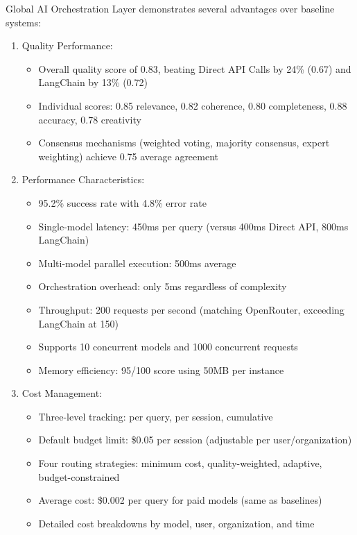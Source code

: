 \documentclass[final,5p,times,twocolumn,authoryear,draft]{elsarticle}
\begin{document}
Global AI Orchestration Layer demonstrates several advantages over baseline systems:

\begin{enumerate}
    \item  Quality Performance:
\begin{itemize}
    \item Overall quality score of 0.83, beating Direct API Calls by 24\% (0.67) and LangChain by 13\% (0.72)
    \item Individual scores: 0.85 relevance, 0.82 coherence, 0.80 completeness, 0.88 accuracy, 0.78 creativity
    \item Consensus mechanisms (weighted voting, majority consensus, expert weighting) achieve 0.75 average agreement
\end{itemize}

\item {Performance Characteristics:}
\begin{itemize}
    \item 95.2\% success rate with 4.8\% error rate
    \item Single-model latency: 450ms per query (versus 400ms Direct API, 800ms LangChain)
    \item Multi-model parallel execution: 500ms average
    \item Orchestration overhead: only 5ms regardless of complexity
    \item Throughput: 200 requests per second (matching OpenRouter, exceeding LangChain at 150)
    \item Supports 10 concurrent models and 1000 concurrent requests
    \item Memory efficiency: 95/100 score using 50MB per instance
\end{itemize}

\item{Cost Management:}
\begin{itemize}
    \item Three-level tracking: per query, per session, cumulative
    \item Default budget limit: \$0.05 per session (adjustable per user/organization)
    \item Four routing strategies: minimum cost, quality-weighted, adaptive, budget-constrained
    \item Average cost: \$0.002 per query for paid models (same as baselines)
    \item Detailed cost breakdowns by model, user, organization, and time
\end{itemize}


\end{enumerate}
\end{document}
